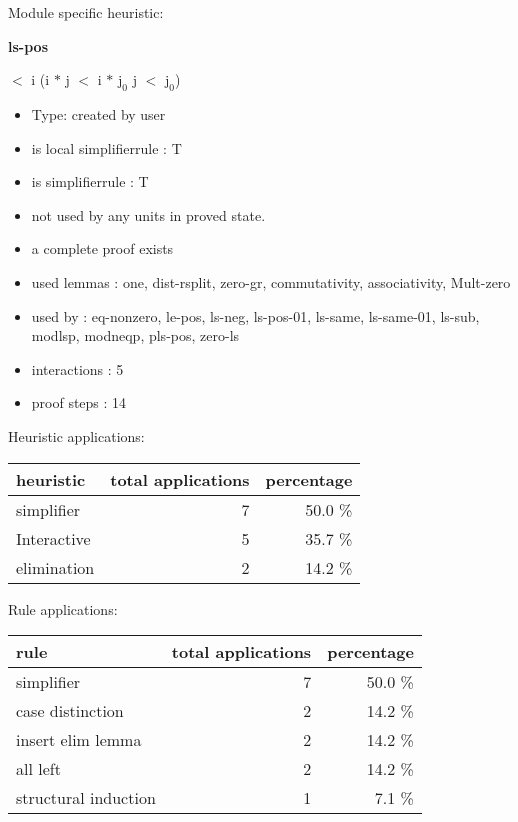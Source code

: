 \documentclass[a4paper]{article}
\begin{document}
Module specific heuristic:

\pagebreak

{\LARGE\bf ls-pos}\label{lemma-ls-pos}

\medskip

  $<$ i \Imp (i $*$ j $<$ i $*$ $\mbox{j}_{0}$ \Equiv j $<$ $\mbox{j}_{0}$)

\begin{itemize}

\item Type: created by user

\item is local simplifierrule : T
\item is simplifierrule : T
\item not used by any units in proved state.
\item       a complete proof exists
\item       used lemmas  : one, dist-rsplit, zero-gr, commutativity, associativity, Mult-zero
\item       used by      : eq-nonzero, le-pos, ls-neg, ls-pos-01, ls-same, ls-same-01, ls-sub, modlsp, modneqp, pls-pos, zero-ls
\item       interactions : 5
\item       proof steps  : 14
\end{itemize}

\medskip


Heuristic applications:

\begin{supertabular}{l|r|r}
heuristic	& total applications & percentage \\ \hline
simplifier & 7 & 50.0 \% \\
Interactive & 5 & 35.7 \% \\
elimination & 2 & 14.2 \% \\

\end{supertabular}

Rule applications:

\begin{supertabular}{l|r|r}
rule	        & total applications & percentage \\ \hline
simplifier & 7 & 50.0 \% \\
case distinction & 2 & 14.2 \% \\
insert elim lemma & 2 & 14.2 \% \\
all left & 2 & 14.2 \% \\
structural induction & 1 & 7.1 \% \\

\end{supertabular}
\end{document}
